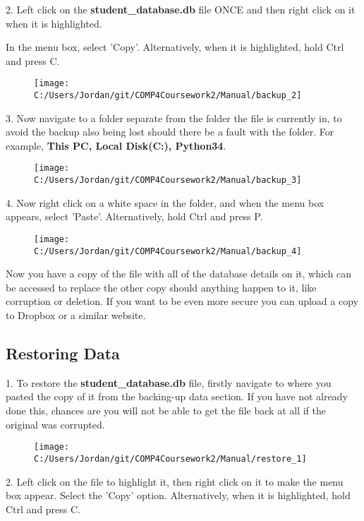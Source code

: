 2. Left click on the \textbf{student\_database.db} file ONCE and then right click on it when it is highlighted.

In the menu box, select 'Copy'. Alternatively, when it is highlighted, hold Ctrl and press C.

\begin{figure}[H]
    \texttt{[image: C:/Users/Jordan/git/COMP4Coursework2/Manual/backup\_2]}
\end{figure}

3. Now navigate to a folder separate from the folder the file is currently in, to avoid the backup also being lost should there be a fault with the folder. For example, \textbf{This PC, Local Disk(C:), Python34}.

\begin{figure}[H]
    \texttt{[image: C:/Users/Jordan/git/COMP4Coursework2/Manual/backup\_3]}
\end{figure}

4. Now right click on a white space in the folder, and when the menu box appears, select 'Paste'.  Alternatively, hold Ctrl and press P.

\begin{figure}[H]
    \texttt{[image: C:/Users/Jordan/git/COMP4Coursework2/Manual/backup\_4]}
\end{figure}

Now you have a copy of the file with all of the database details on it, which can be accessed to replace the other copy should anything happen to it, like corruption or deletion. If you want to be even more secure you can upload a copy to Dropbox or a similar website.

\subsection{Restoring Data}

1. To restore the \textbf{student\_database.db} file, firstly navigate to where you pasted the copy of it from the backing-up data section. If you have not already done this, chances are you will not be able to get the file back at all if the original was corrupted.

\begin{figure}[H]
    \texttt{[image: C:/Users/Jordan/git/COMP4Coursework2/Manual/restore\_1]}
\end{figure}

2. Left click on the file to highlight it, then right click on it to make the menu box appear. Select the 'Copy' option. Alternatively, when it is highlighted, hold Ctrl and press C.

